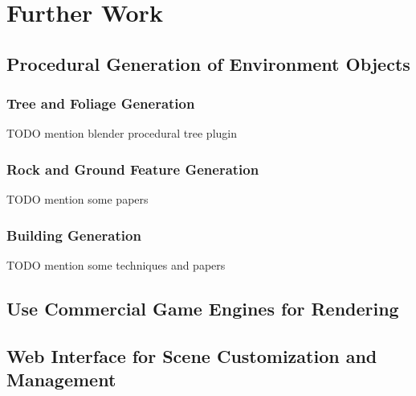 \chapter{Further Work}
\label{chapter:further-work}

\section{Procedural Generation of Environment Objects}

\subsection{Tree and Foliage Generation}

TODO mention blender procedural tree plugin

\subsection{Rock and Ground Feature Generation}

TODO mention some papers

\subsection{Building Generation}

TODO mention some techniques and papers

\section{Use Commercial Game Engines for Rendering}


\section{Web Interface for Scene Customization and Management}
